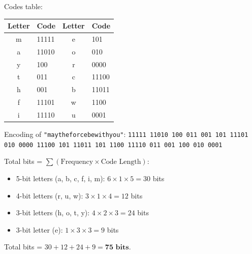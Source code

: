 \documentclass[11pt,answers]{exam}
\begin{document}
\begin{questions}
\begin{parts}
\begin{solution}
\begin{itemize}
\end{itemize}
Codes table:
\begin{center}
\begin{tabular}{|c|l|c|l|}
\hline
\textbf{Letter} & \textbf{Code} & \textbf{Letter} & \textbf{Code} \\ \hline
m & 11111 & e & 101 \\ \hline
a & 11010 & o & 010 \\ \hline
y & 100 & r & 0000 \\ \hline
t & 011 & c & 11100 \\ \hline
h & 001 & b & 11011 \\ \hline
f & 11101 & w & 1100 \\ \hline
i & 11110 & u & 0001 \\ \hline
\end{tabular}
\end{center}
Encoding of \texttt{"maytheforcebewithyou"}:
\texttt{11111 11010 100 011 001 101 11101 010 0000 11100 101 11011 101 1100 11110 011 001 100 010 0001}

Total bits = $\sum (\text{Frequency} \times \text{Code Length})$:
\begin{itemize}
\item 5-bit letters (a, b, c, f, i, m): $6 \times 1 \times 5 = 30$ bits
\item 4-bit letters (r, u, w): $3 \times 1 \times 4 = 12$ bits
\item 3-bit letters (h, o, t, y): $4 \times 2 \times 3 = 24$ bits
\item 3-bit letter (e): $1 \times 3 \times 3 = 9$ bits
\end{itemize}
Total bits = $30 + 12 + 24 + 9 = \mathbf{75\text{ bits}}$.
\end{solution}
\end{parts}

\end{questions}
\end{document}
